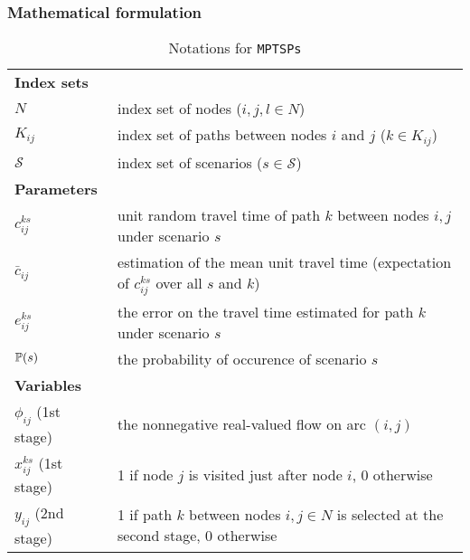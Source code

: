 \subsubsection{Mathematical formulation}
\begin{table}[H]
	\caption{Notations for \texttt{MPTSPs}}
	\label{notation}
	\resizebox{\textwidth}{!}
	{
		\begin{tabular}{ll}
			\toprule
			\textbf{Index sets} &  \\ 
			$N$ & \textrm{index set of nodes ($i,j,l\in N$)} \\ 
			$K_{ij}$ & \textrm{index set of paths between nodes $i$ and $j$ ($k\in K_{ij}$)} \\ 
			$\mathcal{S}$ & \textrm{index set of scenarios ($s\in \mathcal{S}$)}\\
			\textbf{Parameters} &   \\ 
			$c_{ij}^{ks}$ & \textrm{unit random travel time of path $k$ between nodes $i,j$ under scenario $s$} \\ 
			$\bar{c}_{ij}$ & \textrm{estimation of the mean unit travel time (expectation of $c_{ij}^{ks}$ over all $s$ and $k$)} \\ 
			$e_{ij}^{ks}$ & \textrm{the error on the travel time estimated for path $k$ under scenario $s$} \\ 
			$\operatorname*{\mathbb{P}}(s)$ & \textrm{the probability of occurence of scenario $s$} \\ 
			\textbf{Variables} &  \\ 
			$\phi_{ij}$ (1st stage) & \textrm{the nonnegative real-valued flow on arc $(i,j)$}\\
			$x_{ij}^{ks}$ (1st stage) & \textrm{1 if node $j$ is visited just after node $i$, 0 otherwise} \\ 
			$y_{ij}$ (2nd stage)& \textrm{1 if path $k$ between nodes $i,j\in N$ is selected at the second stage, 0 otherwise} \\ 

			\hline
		\end{tabular}
 	}
\end{table} 

